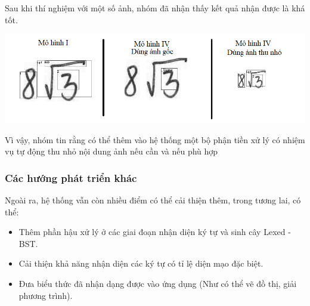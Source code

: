 \documentclass[a4paper,12pt]{article}
\begin{document}
	Sau khi thí nghiệm với một số ảnh, nhóm đã nhận thấy kết quả nhận được là khá tốt.
	
	\begin{center}
		\centering
		\includegraphics[width=0.875\linewidth]{compare_future.png}
		\vspace{0.5cm}
		
	\end{center}
	
	Vì vậy, nhóm tin rằng có thể thêm vào hệ thống một bộ phận tiền xử lý có nhiệm vụ tự động thu nhỏ nội dung ảnh nếu cần và nếu phù hợp
	
	\subsubsection{Các hướng phát triển khác}
	
	Ngoài ra, hệ thống vẫn còn nhiều điểm có thể cải thiện thêm, trong tương lai, có thể:
	\begin{itemize}
		\item Thêm phần hậu xử lý ở các giai đoạn nhận diện ký tự và sinh cây Lexed - BST.
		\item Cải thiện khả năng nhận diện các ký tự có tỉ lệ diện mạo đặc biệt.
		\item Đưa biểu thức đã nhận dạng được vào ứng dụng (Như có thể vẽ đồ thị, giải phương trình).
	\end{itemize}
	
	
	
	\newpage
	
	
\end{document}
